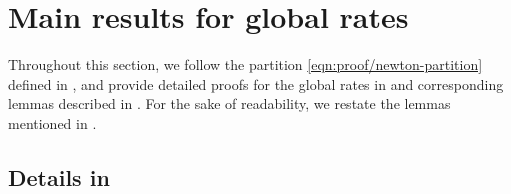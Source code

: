 \section{Main results for global rates}
\label{sec:appendix/global-rate-under-local-boosting}


Throughout this section, we follow the partition \eqref{eqn:proof/newton-partition} defined in , 
and provide detailed proofs for the global rates in  and corresponding lemmas described in .
For the sake of readability, we restate the lemmas mentioned in .

\subsection{Details in }

